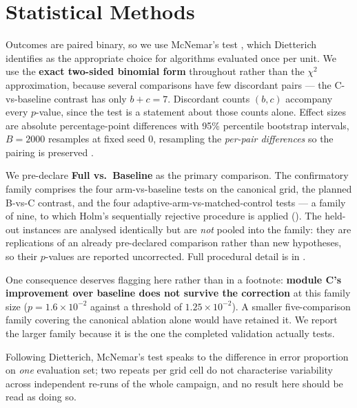 \section{Statistical Methods}
\label{sec:stats}

Outcomes are paired binary, so we use McNemar's test \cite{mcnemar1947},
which Dietterich \cite{dietterich1998} identifies as the appropriate
choice for algorithms evaluated once per unit. We use the \textbf{exact
two-sided binomial form} throughout rather than the $\chi^2$
approximation, because several comparisons have few discordant pairs ---
the C-vs-baseline contrast has only $b+c=7$. Discordant counts $(b,c)$
accompany every $p$-value, since the test is a statement about those
counts alone. Effect sizes are absolute percentage-point differences with
95\% percentile bootstrap intervals, $B=2000$ resamples at fixed seed 0,
resampling the \emph{per-pair differences} so the pairing is preserved
\cite{efron1993}.

We pre-declare \textbf{Full vs.\ Baseline} as the primary comparison. The
confirmatory family comprises the four arm-vs-baseline tests on the
canonical grid, the planned B-vs-C contrast, and the four
adaptive-arm-vs-matched-control tests --- a family of nine, to which
Holm's sequentially rejective procedure \cite{holm1979} is applied
(\SItables{}). The held-out instances are analysed identically
but are \emph{not} pooled into the family: they are replications of an
already pre-declared comparison rather than new hypotheses, so their
$p$-values are reported uncorrected. Full procedural detail is in
\SItables{}.

One consequence deserves flagging here rather than in a footnote:
\textbf{module C's improvement over baseline does not survive the
correction} at this family size ($p=1.6\times10^{-2}$ against a threshold
of $1.25\times10^{-2}$). A smaller five-comparison family covering the
canonical ablation alone would have retained it. We report the larger
family because it is the one the completed validation actually tests.

Following Dietterich, McNemar's test speaks to the difference in error
proportion on \emph{one} evaluation set; two repeats per grid cell do not
characterise variability across independent re-runs of the whole
campaign, and no result here should be read as doing so.
